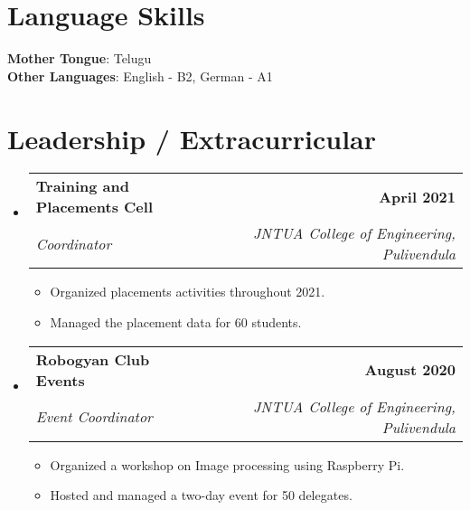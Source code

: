 \documentclass[letterpaper,11pt]{article}
\makeatletter
\newcommand{\resumeItem}[1]{
  \item\small{
    {#1 \vspace{-2pt}}
  }
}
\newcommand{\resumeSubheading}[4]{
  \vspace{-2pt}\item
    \begin{tabular*}{1.0\textwidth}[t]{l@{\extracolsep{\fill}}r}
      \textbf{#1} & \textbf{\small #2} \\
      \textit{\small#3} & \textit{\small #4} \\
    \end{tabular*}\vspace{-7pt}
}
\newcommand{\resumeSubHeadingListStart}{\begin{itemize}[leftmargin=0.0in, label={}]}
\newcommand{\resumeSubHeadingListEnd}{\end{itemize}}
\newcommand{\resumeItemListStart}{\begin{itemize}}
\newcommand{\resumeItemListEnd}{\end{itemize}\vspace{-5pt}}
\makeatother
\begin{document}
\section{Language Skills}
\begin{itemize}[leftmargin=0.15in, label={}]
  \small{\item{
        \textbf{Mother Tongue}{: Telugu} \\
        \textbf{Other Languages}{: English - B2, German - A1} \\
        }}
\end{itemize}
\vspace{-16pt}


\section{Leadership / Extracurricular}
\resumeSubHeadingListStart
\resumeSubheading{Training and Placements Cell }{April 2021}{Coordinator}{JNTUA College of Engineering, Pulivendula}
\resumeItemListStart
\resumeItem{Organized placements activities throughout 2021.}
\resumeItem{Managed the placement data for 60 students.}
\resumeItemListEnd

\resumeSubheading{Robogyan Club Events}{August 2020}{Event Coordinator}{JNTUA College of Engineering, Pulivendula}
\resumeItemListStart
\resumeItem{Organized a workshop on Image processing using Raspberry Pi.}
\resumeItem{Hosted and managed a two-day event for 50 delegates.}
\resumeItemListEnd
\resumeSubHeadingListEnd
\end{document}
